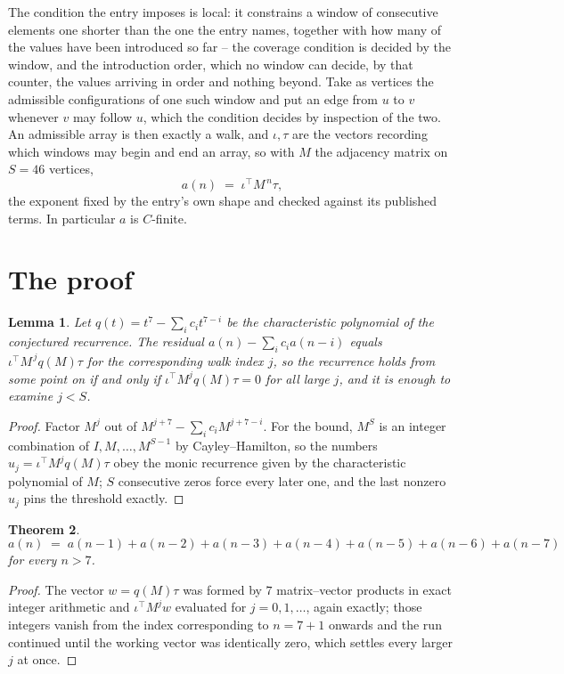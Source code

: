 \documentclass[11pt,a4paper]{article}
\theoremstyle{plain}
\newtheorem{theorem}{Theorem}
\newtheorem{lemma}[theorem]{Lemma}
\theoremstyle{definition}
\begin{document}
The condition the entry imposes is local: it constrains a window of consecutive elements one shorter than the one the entry names, together with how many of the values have been introduced so far -- the coverage condition is decided by the window, and the introduction order, which no window can decide, by that counter, the values arriving in order and nothing beyond. Take as vertices the admissible configurations of one such window and put an edge from $u$ to $v$ whenever $v$ may follow $u$, which the condition decides by inspection of the two.
An admissible array is then exactly a walk, and $\iota,\tau$ are the vectors recording which windows may begin and end an array, so with $M$ the adjacency matrix on $S=46$ vertices,
\[
a(n)\;=\;\iota^{\!\top}M^{\,n}\tau ,
\]
the exponent fixed by the entry's own shape and checked against its published terms. In
particular $a$ is $C$-finite.

\section{The proof}

\begin{lemma}\label{lem:crit}
Let $q(t)=t^{7}-\sum_i c_it^{7-i}$ be the characteristic polynomial of the
conjectured recurrence. The residual $a(n)-\sum_ic_ia(n-i)$ equals
$\iota^{\!\top}M^{\,j}q(M)\tau$ for the corresponding walk index $j$, so the recurrence
holds from some point on if and only if $\iota^{\!\top}M^{j}q(M)\tau=0$ for all large $j$,
and it is enough to examine $j<S$.
\end{lemma}

\begin{proof}
Factor $M^{j}$ out of $M^{j+7}-\sum_ic_iM^{j+7-i}$. For the bound, $M^{S}$
is an integer combination of $I,M,\dots,M^{S-1}$ by Cayley--Hamilton, so the numbers
$u_j=\iota^{\!\top}M^{j}q(M)\tau$ obey the monic recurrence given by the characteristic
polynomial of $M$; $S$ consecutive zeros force every later one, and the last nonzero $u_j$
pins the threshold exactly.
\end{proof}

\begin{theorem}
\[
a(n)\;=\;a(n-1) + a(n-2) + a(n-3) + a(n-4) + a(n-5) + a(n-6) + a(n-7)
\]
for every $n>7$.
\end{theorem}

\begin{proof}
The vector $w=q(M)\tau$ was formed by $7$ matrix--vector products in exact integer
arithmetic and $\iota^{\!\top}M^{j}w$ evaluated for $j=0,1,\dots$, again exactly; those
integers vanish from the index corresponding to $n=7+1$ onwards and the run continued
until the working vector was identically zero, which settles every larger $j$ at once.
\end{proof}
\end{document}
